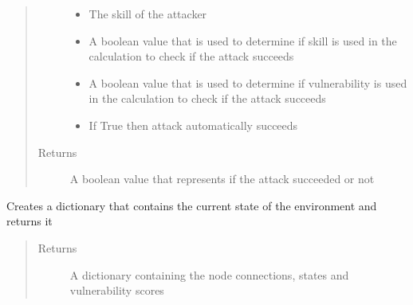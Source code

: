 \documentclass[letterpaper,10pt,english]{sphinxmanual}
\begin{document}
\begin{fulllineitems}
\begin{fulllineitems}
\begin{quote}
\begin{description}
\begin{itemize}
\item {}
\sphinxAtStartPar
{} \textendash{} The skill of the attacker

\item {}
\sphinxAtStartPar
{} \textendash{} A boolean value that is used to determine if skill is used in the calculation to check if the
attack succeeds

\item {}
\sphinxAtStartPar
{} \textendash{} A boolean value that is used to determine if vulnerability is used in the calculation to
check if the attack succeeds

\item {}
\sphinxAtStartPar
{} \textendash{} If True then attack automatically succeeds

\end{itemize}

\item[{Returns}] \leavevmode
\sphinxAtStartPar
A boolean value that represents if the attack succeeded or not

\end{description}\end{quote}

\end{fulllineitems}


\begin{fulllineitems}
\label{\detokenize{source/yawning_titan.envs.generic.core:yawning_titan.envs.generic.core.network_interface.NetworkInterface.create_json_time_step}}
\sphinxAtStartPar
Creates a dictionary that contains the current state of the environment and returns it
\begin{quote}\begin{description}
\item[{Returns}] \leavevmode
\sphinxAtStartPar
A dictionary containing the node connections, states and vulnerability scores

\end{description}\end{quote}


\end{fulllineitems}
\end{fulllineitems}
\end{document}
